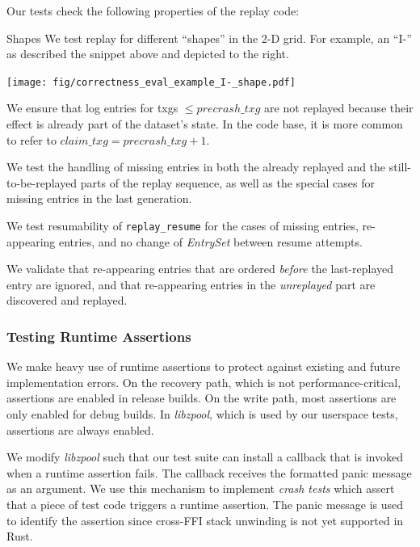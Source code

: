 \documentclass[12pt,a4paper,twoside]{book}
\begin{document}
{Our tests check the following properties of the replay code:
\begin{description}[noitemsep,leftmargin=1.5cm,labelindent=1cm]
    \begin{minipage}{0.59\textwidth}
    \item[Shapes]
            We test replay for different ``shapes'' in the 2-D grid.
            For example, an ``I-'' as described the snippet above and depicted to the right.
        \end{minipage}
        \begin{minipage}[c]{0.3\textwidth}
            \texttt{[image: fig/correctness\_eval\_example\_I-\_shape.pdf]}
        \end{minipage}
    \item[Claim Txg] We ensure that log entries for txgs $\le precrash\_txg$ are not replayed because their effect is already part of the dataset's state.
        In the code base, it is more common to refer to $claim\_txg = precrash\_txg + 1$.
    \item[Missing Entry Handling] We test the handling of missing entries in both the already replayed and the still-to-be-replayed parts of the replay sequence, as well as the special cases for missing entries in the last generation.
    \item[Resumability] We test resumability of \lstinline{replay_resume} for the cases of missing entries, re-appearing entries, and no change of \textit{EntrySet} between resume attempts.
    \item[Entry Reappearance] We validate that re-appearing entries that are ordered \textit{before} the last-replayed entry are ignored, and that re-appearing entries in the \textit{unreplayed} part are discovered and replayed.
\end{description}

\subsubsection{Testing Runtime Assertions}
We make heavy use of runtime assertions to protect against existing and future implementation errors.
On the recovery path, which is not performance-critical, assertions are enabled in release builds.
On the write path, most assertions are only enabled for debug builds.
In \textit{libzpool}, which is used by our userspace tests, assertions are always enabled.

We modify \textit{libzpool} such that our test suite can install a callback that is invoked when a runtime assertion fails.
The callback receives the formatted panic message as an argument.
We use this mechanism to implement \textit{crash tests} which assert that a piece of test code triggers a runtime assertion.
The panic message is used to identify the assertion since cross-FFI stack unwinding is not yet supported in Rust.

}
\end{document}
